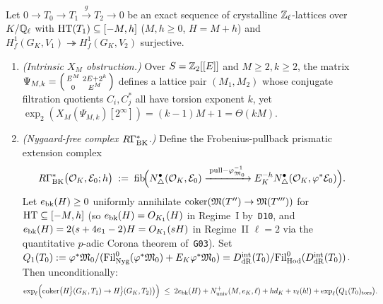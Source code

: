 \begin{theorem}\label{thm:2:rbk}
\tagProved{}
Let $0 \to T_0 \to T_1 \xrightarrow{g} T_2 \to 0$ be an exact sequence of crystalline $\mathbb{Z}_\ell$-lattices over $K/\mathbb{Q}_\ell$ with $\mathrm{HT}(T_1) \subseteq [-M, h]$ ($M, h \ge 0$, $H = M+h$) and $H^1_f(G_K, V_1) \twoheadrightarrow H^1_f(G_K, V_2)$ surjective.
\begin{enumerate}[label=\textup{(\roman*)}]
\item \emph{(Intrinsic $X_M$ obstruction.)} Over $S = \mathbb{Z}_2[[E]]$ and $M \ge 2, k \ge 2$, the matrix $\Psi_{M,k} = \begin{psmallmatrix} E^M & 2E + 2^k \\ 0 & E^M \end{psmallmatrix}$ defines a lattice pair $(M_1, M_2)$ whose conjugate filtration quotients $C_i, C_j^*$ all have torsion exponent $k$, yet $\exp_2(X_M(\Psi_{M,k})[2^\infty]) = (k-1)M + 1 = \Theta(kM)$.
\item \emph{(Nygaard-free complex $R\Gamma_{\mathrm{BK}}^*$.)} Define the Frobenius-pullback prismatic extension complex
\begin{equation}\label{eq:2:rbk}
  R\Gamma_{\mathrm{BK}}^*\bigl(\mathcal{O}_K, \mathcal{E}_0; h\bigr) \;:=\; \operatorname{fib}\!\Bigl(N^\bullet_\triangle(\mathcal{O}_K, \mathcal{E}_0) \xrightarrow{\;\mathrm{pull} - \varphi_{\mathfrak{M}_0}^{-1}\;} E_K^{-h} N^\bullet_\triangle(\mathcal{O}_K, \varphi^*\mathcal{E}_0)\Bigr).
\end{equation}
Let $e_{\mathrm{bk}}(H) \ge 0$ uniformly annihilate $\operatorname{coker}(\mathfrak{M}(T'') \to \mathfrak{M}(T'''))$ for $\mathrm{HT} \subseteq [-M,h]$ (so $e_{\mathrm{bk}}(H) = O_{K_1}(H)$ in Regime~I by~\texttt{D10}, and $e_{\mathrm{bk}}(H) = 2(s + 4e_1 - 2)H = O_{K_1}(sH)$ in Regime~II $\ell = 2$ via the quantitative $p$-adic Corona theorem of~\texttt{G03}). Set $Q_1(T_0) := \varphi^*\mathfrak{M}_0 / (\mathrm{Fil}^0_{\mathrm{Nyg}}(\varphi^*\mathfrak{M}_0) + E_K\varphi^*\mathfrak{M}_0) = D_{\mathrm{dR}}^{\mathrm{int}}(T_0)/\mathrm{Fil}^0_{\mathrm{Hod}}(D_{\mathrm{dR}}^{\mathrm{int}}(T_0))$. Then unconditionally:
\begin{equation}\label{eq:2:lin-bridge}
  \exp_\ell\Bigl(\operatorname{coker}\bigl(H^1_f(G_K, T_1) \to H^1_f(G_K, T_2)\bigr)\Bigr) \;\le\; 2 e_{\mathrm{bk}}(H) + N_{\mathrm{univ}}^+(M, e_K, \ell) + h d_K + v_\ell(h!) + \exp_\ell\bigl(Q_1(T_0)_{\mathrm{tors}}\bigr).
\end{equation}
\end{enumerate}
\end{theorem}
